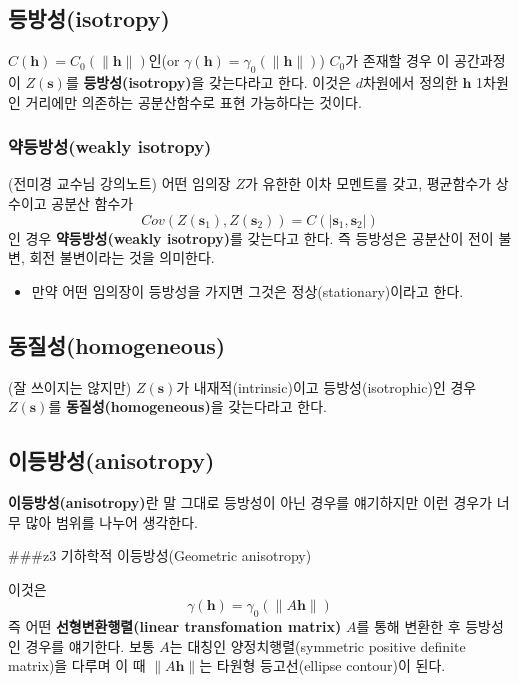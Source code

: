 \documentclass[b5paper,]{scrbook}
\providecommand{\tightlist}{%
  \setlength{\itemsep}{0pt}\setlength{\parskip}{0pt}}
\theoremstyle{plain}
\theoremstyle{definition}
\numberwithin{equation}{section}
\begin{document}
\hypertarget{isotropy}{%
\subsection{등방성(isotropy)}\label{isotropy}}

\(C(\mathbf{h})=C_{0}(\|\mathbf{h}\|)\)인(or \(\gamma(\mathbf{h})=\gamma_{0}(\|\mathbf{h}\|)\)) \(C_{0}\)가 존재할 경우 이 공간과정이 \(Z(\mathbf{s})\)를 \textbf{등방성(isotropy)}을 갖는다라고 한다. 이것은 \(d\)차원에서 정의한 \(\mathbf{h}\) 1차원인 거리에만 의존하는 공분산함수로 표현 가능하다는 것이다.

\hypertarget{weakly-isotropy}{%
\subsubsection{약등방성(weakly isotropy)}\label{weakly-isotropy}}

(전미경 교수님 강의노트) 어떤 임의장 \(Z\)가 유한한 이차 모멘트를 갖고, 평균함수가 상수이고 공분산 함수가
\[Cov(Z(\mathbf{s}_{1}), Z(\mathbf{s}_{2}))=C(|\mathbf{s}_{1},\mathbf{s}_{2}|)\]
인 경우 \textbf{약등방성(weakly isotropy)}를 갖는다고 한다. 즉 등방성은 공분산이 전이 불변, 회전 불변이라는 것을 의미한다.

\begin{itemize}
\tightlist
\item
  만약 어떤 임의장이 등방성을 가지면 그것은 정상(stationary)이라고 한다.
\end{itemize}

\hypertarget{homogeneous}{%
\subsection{동질성(homogeneous)}\label{homogeneous}}

(잘 쓰이지는 않지만) \(Z(\mathbf{s})\)가 내재적(intrinsic)이고 등방성(isotrophic)인 경우 \(Z(\mathbf{s})\)를 \textbf{동질성(homogeneous)}을 갖는다라고 한다.

\hypertarget{anisotropy}{%
\subsection{이등방성(anisotropy)}\label{anisotropy}}

\textbf{이등방성(anisotropy)}란 말 그대로 등방성이 아닌 경우를 얘기하지만 이런 경우가 너무 많아 범위를 나누어 생각한다.

\#\#\#z3 기하학적 이등방성(Geometric anisotropy)

이것은
\[\gamma(\mathbf{h})=\gamma_{0}(\|A\mathbf{h}\|)\]
즉 어떤 \textbf{선형변환행렬(linear transfomation matrix)} \(A\)를 통해 변환한 후 등방성인 경우를 얘기한다. 보통 \(A\)는 대칭인 양정치행렬(symmetric positive definite matrix)을 다루며 이 때 \(\|A\mathbf{h}\|\)는 타원형 등고선(ellipse contour)이 된다.
\end{document}
